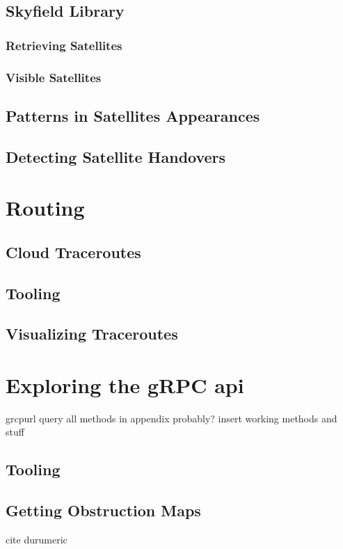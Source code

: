 \documentclass[IN,11pt,twoside,openright,bachelor,english]{tumthesis}
\begin{document}
	
\section{Skyfield Library}
\subsection*{Retrieving Satellites}
\subsection*{Visible Satellites}
\section{Patterns in Satellites Appearances}
\section{Detecting Satellite Handovers}

\chapter{Routing}
\section{Cloud Traceroutes}
\section{Tooling}
\section{Visualizing Traceroutes}


\chapter{Exploring the gRPC api}

grcpurl
query all methods
in appendix probably? insert working methods and stuff


\section{Tooling}
\section{Getting Obstruction Maps}

cite durumeric
\end{document}
